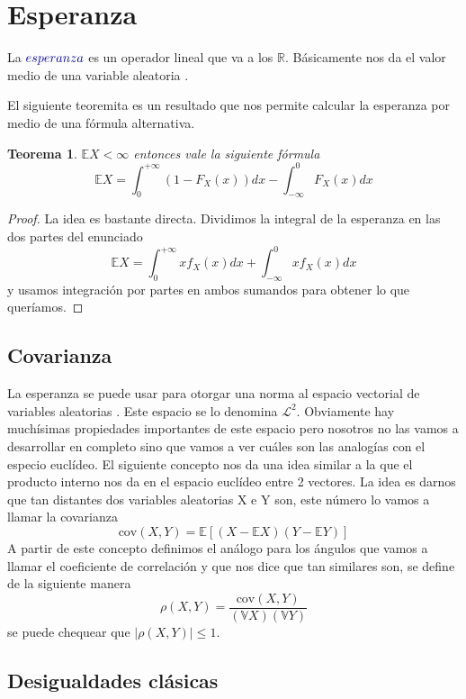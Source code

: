 \documentclass[11pt]{article}
\theoremstyle{plain} %
\newtheorem{teorema}{\color{rojo}Teorema}
\theoremstyle{definition}
\theoremstyle{remark}
\def\V{\mathbb{V}}
\def\E{\mathbb{E}}
\def\R{\mathbb{R}}
\def\va{variable aleatoria }
\def\vas{variables aleatorias }
\def\blue{\textcolor{blue!60!black}}
\begin{document}
\bigskip

\section{Esperanza}

La $\blue{esperanza}$ es un operador lineal que va a los $\R$. Básicamente nos da el valor medio de una \va. 

El siguiente teoremita es un resultado que nos permite calcular la esperanza por medio de una fórmula alternativa.

\begin{teorema}
	$\E X < \infty$ entonces vale la siguiente fórmula
	\[ \E X = \int_{0}^{+ \infty}  \left( 1 - F_{X}(x)\right)  dx - \int_{- \infty}^{0} F_{X}(x) dx \]
\end{teorema}

\begin{proof}
	La idea es bastante directa. Dividimos la integral de la esperanza en las dos partes del enunciado 
	\[ \E X = \int_{0}^{+ \infty}xf_{X}(x) dx + \int_{- \infty}^{0} xf_{X}(x) dx \]
	y usamos integración por partes en ambos sumandos para obtener lo que queríamos.
\end{proof}


\subsection{Covarianza}

La esperanza se puede usar para otorgar una norma al espacio vectorial de \vas. Este espacio se lo denomina $\mathcal{L}^2$. Obviamente hay muchísimas propiedades importantes de este espacio pero nosotros no las vamos a desarrollar en completo sino que vamos a ver cuáles son las analogías con el especio euclídeo. El siguiente concepto nos da una idea similar a la que el producto interno nos da en el espacio euclídeo entre 2 vectores. La idea es darnos que tan distantes dos \vas X e Y son, este número lo vamos a llamar la \blue{covarianza}
\[ \text{cov}(X,Y) = \E \left[ \left( X - \E X \right) \left( Y - \E Y \right) \right]  \]
A partir de este concepto definimos el análogo para los ángulos que vamos a llamar el \blue{coeficiente de correlación} y que nos dice que tan similares son, se define de la siguiente manera
\[ \rho(X,Y) = \dfrac{\text{cov}(X,Y)}{(\V X) (\V Y)} \]
se puede chequear que $|\rho(X,Y)| \leq 1$.

\medskip



\subsection{Desigualdades clásicas}
\end{document}
